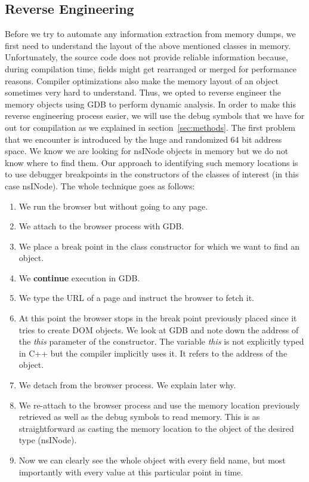 \subsection{Reverse Engineering}
Before we try to automate any information extraction from memory
dumps, we first need to understand the layout of the above mentioned
classes in memory. Unfortunately, the source code does not provide
reliable information because, during compilation time, fields might
get rearranged or merged for performance reasons. Compiler
optimizations also make the memory layout of an object sometimes very
hard to understand. Thus, we opted to reverse engineer the memory
objects using GDB to perform dynamic analysis.  In order to make this
reverse engineering process easier, we will use the debug symbols that
we have for out tor compilation as we explained in
section~\ref{sec:methods}. The first problem that we encounter is
introduced by the huge and randomized 64 bit address space. We know we
are looking for nsINode objects in memory but we do not know where to
find them. Our approach to identifying such memory locations is to use
debugger breakpoints in the constructors of the classes of interest
(in this case nsINode). The whole technique goes as follows:
\begin{enumerate}
\item We run the browser but without going to any page.
\item We attach to the browser process with GDB.
\item We place a break point in the class constructor for which we want
  to find an object.
\item We \textbf{continue} execution in GDB.
\item We type the URL of a page and instruct the browser to fetch it.
\item At this point the browser stops in the break point previously
  placed since it tries to create DOM objects. We look at GDB and
  note down the address of the \textit{this} parameter of the
  constructor. The variable \textit{this} is not explicitly typed in
  C++ but the compiler implicitly uses it. It refers to the address of
  the object.
\item We detach from the browser process. We explain later why.
\item We re-attach to the browser process and use the memory location
  previously retrieved as well as the debug symbols to read
  memory. This is as straightforward as casting the memory location to
  the object of the desired type (nsINode).
\item Now we can clearly see the whole object with every field name,
  but most importantly with every value at this particular point in
  time.
\end{enumerate}

